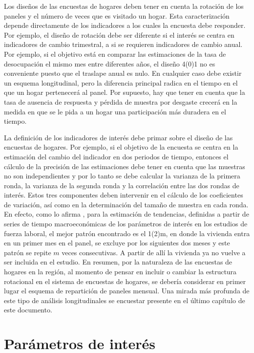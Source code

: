 Los diseños de las encuestas de hogares deben tener en cuenta la rotación de los paneles y el número de veces que es visitado un hogar. Esta caracterización depende directamente de los indicadores a los cuales la encuesta debe responder. Por ejemplo, el diseño de rotación debe ser diferente si el interés se centra en indicadores de cambio trimestral, a si se requieren indicadores de cambio anual. Por ejemplo, si el objetivo está en comparar las estimaciones de la tasa de desocupación el mismo mes entre diferentes años, el diseño 4(0)1 no es conveniente puesto que el traslape anual es nulo. En cualquier caso debe existir un esquema longitudinal, pero la diferencia principal radica en el tiempo en el que un hogar pertenecerá al panel. Por supuesto, hay que tener en cuenta que la tasa de ausencia de respuesta y pérdida de muestra por desgaste crecerá en la medida en que se le pida a un hogar una participación más duradera en el tiempo.

La definición de los indicadores de interés debe primar sobre el diseño de las encuestas de hogares. Por ejemplo, si el objetivo de la encuesta se centra en la estimación del cambio del indicador en dos periodos de tiempo, entonces el cálculo de la precisión de las estimaciones debe tener en cuenta que las muestras no son independientes y por lo tanto se debe calcular la varianza de la primera ronda, la varianza de la segunda ronda y la correlación entre las dos rondas de interés. Estos tres componentes deben intervenir en el cálculo de los coeficientes de variación, así como en la determinación del tamaño de muestra en cada ronda. En efecto, como lo afirma \citet[pág. 236]{McLaren_Steel_2001}, para la estimación de tendencias, definidas a partir de series de tiempo macroeconómicas de los parámetros de interés en los estudios de fuerza laboral, el mejor patrón encontrado es el 1(2)m, en donde la vivienda entra en un primer mes en el panel, se excluye por los siguientes dos meses y este patrón se repite \(m\) veces consecutivas. A partir de allí la vivienda ya no vuelve a ser incluida en el estudio. En resumen, por la naturaleza de las encuestas de hogares en la región, al momento de pensar en incluir o cambiar la estructura rotacional en el sistema de encuestas de hogares, se debería considerar en primer lugar el esquema de repartición de paneles mensual. Una mirada más profunda de este tipo de análisis longitudinales se encuestar presente en el último capítulo de este documento.

\hypertarget{parametros-de-interes}{%
\section{Parámetros de interés}\label{parametros-de-interes}}

